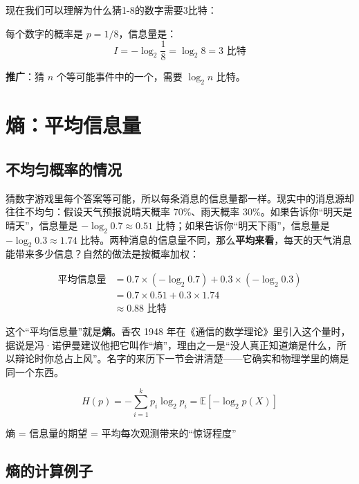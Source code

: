 现在我们可以理解为什么猜1-8的数字需要3比特：

每个数字的概率是 $p = 1/8$，信息量是：
\[
I = -\log_2 \frac{1}{8} = \log_2 8 = 3 \text{ 比特}
\]

\textbf{推广}：猜 $n$ 个等可能事件中的一个，需要 $\log_2 n$ 比特。

\section{熵：平均信息量}

\subsection{不均匀概率的情况}

猜数字游戏里每个答案等可能，所以每条消息的信息量都一样。现实中的消息源却往往不均匀：假设天气预报说晴天概率 70\%、雨天概率 30\%。如果告诉你“明天是晴天”，信息量是 $-\log_2 0.7 \approx 0.51$ 比特；如果告诉你“明天下雨”，信息量是 $-\log_2 0.3 \approx 1.74$ 比特。两种消息的信息量不同，那么\textbf{平均来看}，每天的天气消息能带来多少信息？自然的做法是按概率加权：

\begin{align}
\text{平均信息量} &= 0.7 \times (-\log_2 0.7) + 0.3 \times (-\log_2 0.3) \\
&= 0.7 \times 0.51 + 0.3 \times 1.74 \\
&\approx 0.88 \text{ 比特}
\end{align}

这个“平均信息量”就是\textbf{熵}。香农 1948 年在《通信的数学理论》里引入这个量时，据说是冯·诺伊曼建议他把它叫作“熵”，理由之一是“没人真正知道熵是什么，所以辩论时你总占上风”。名字的来历下一节会讲清楚——它确实和物理学里的熵是同一个东西。

\begin{keyformula}[title=熵（Shannon Entropy）]
\begin{equation}
H(p) = -\sum_{i=1}^{k} p_i \log_2 p_i = \mathbb{E}[-\log_2 p(X)]
\end{equation}

熵 = 信息量的期望 = 平均每次观测带来的“惊讶程度”
\end{keyformula}

\subsection{熵的计算例子}

